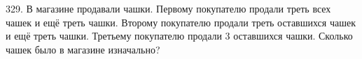 329. В магазине продавали чашки. Первому покупателю продали треть всех чашек и ещё треть чашки. Второму покупателю продали треть оставшихся чашек и ещё
треть чашки. Третьему покупателю продали 3 оставшихся чашки. Сколько чашек было в магазине изначально?\\
